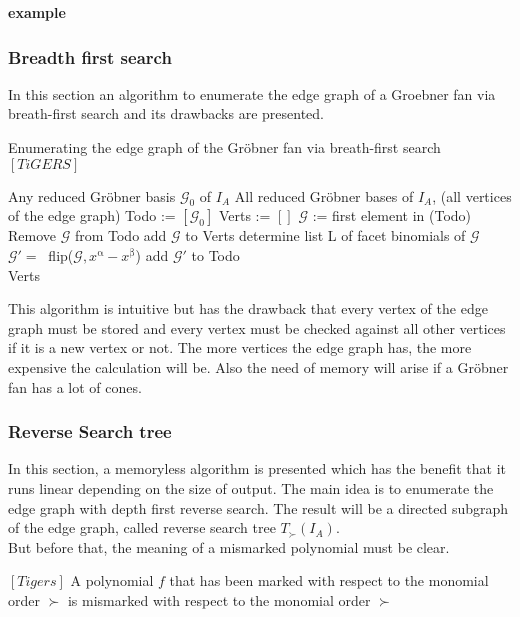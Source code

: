 \textbf{example}


\newpage

\subsubsection{Breadth first search}

In this section an algorithm to enumerate the edge graph of a Groebner fan via breath-first search and its drawbacks are presented.

\begin{algorithm}
\caption{Enumerating the edge graph of the Gröbner fan via breath-first search $\left[ TiGERS\right]  $}
\label{breadth-alg}
\begin{algorithmic}[1]

\Require
Any reduced Gröbner basis $ \mathcal{G}_0 $ of $I_A$
\Ensure All reduced Gröbner bases of $I_A$, (all vertices of the edge graph)
\State Todo := $\left[ \mathcal{G}_0 \right]  $
\State Verts := $\left[ \right] $
\State $\mathcal{G}$ := first element in (Todo)
\State Remove $\mathcal{G} $ from Todo
\State add $\mathcal{G}$ to Verts 
\State determine list L of facet binomials of $\mathcal{G} $
 \State $\mathcal{G}' =~$ flip($\mathcal{G},x^{\upalpha} - x^{\upbeta} $)
 \State add $\mathcal{G}'$ to Todo
 \EndIf
 \EndFor
\EndWhile \\
\Return Verts

\end{algorithmic}
\end{algorithm}

This algorithm is intuitive but has the drawback that every vertex of the edge graph must be stored and every vertex must be checked against all other vertices if it is a new vertex or not. 
The more vertices the edge graph has, the more expensive the calculation will be. Also the need of memory will arise if a Gröbner fan has a lot of cones.
 

\subsubsection{Reverse Search tree}
In this section, a memoryless algorithm is presented which has the benefit that it runs linear depending on the size of output. The main idea is to enumerate the edge graph with depth first reverse search. The result will be a directed subgraph of the edge graph, called reverse search tree $T_{\succ}(I_{A}) $.\\
But before that, the meaning of a mismarked polynomial must be clear.
\begin{env_definition}
$\left[Tigers \right]  $
A polynomial $f$ that has been marked with respect to the monomial order $\succ$  is mismarked with respect to the monomial order $\succ$  
\end{env_definition}


